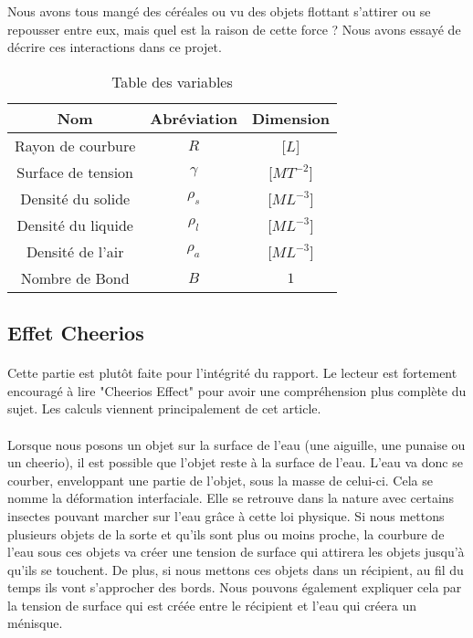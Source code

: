 Nous avons tous mangé des céréales ou vu des objets flottant s'attirer ou se repousser entre eux, mais quel est la raison de cette force ? Nous avons essayé de décrire ces interactions dans ce projet.

\begin{table}
    \centering
    \begin{tabular}{ccc}
        \hline
        Nom                & Abréviation & Dimension\\
        \hline
        Rayon de courbure  & $R$         & [$L$]\\
        Surface de tension & $\gamma$    & [$MT^{-2}$]\\ 
        Densité du solide  & $\rho_s$    & [$ML^{-3}$]\\
        Densité du liquide & $\rho_l$    & [$ML^{-3}$]\\
        Densité de l'air   & $\rho_a$    & [$ML^{-3}$]\\
        Nombre de Bond     & $B$         & $1$\\
        \hline
    \end{tabular}
    \caption{Table des variables}
\end{table}

\subsection{Effet Cheerios}
    \paragraph*{}{
        Cette partie est plutôt faite pour l'intégrité du rapport. Le lecteur est fortement encouragé à lire "Cheerios Effect"\cite{vella_cheerios_2005} pour avoir une compréhension plus complète du sujet. Les calculs viennent principalement de cet article.
    }
    \paragraph*{}{
        Lorsque nous posons un objet sur la surface de l'eau (une aiguille, une punaise ou un cheerio), il est possible que l'objet reste à la surface de l'eau. L'eau va donc se courber, enveloppant une partie de l'objet, sous la masse de celui-ci. Cela se nomme la déformation interfaciale. Elle se retrouve dans la nature avec certains insectes pouvant marcher sur l'eau grâce à cette loi physique. Si nous mettons plusieurs objets de la sorte et qu'ils sont plus ou moins proche, la courbure de l'eau sous ces objets va créer une tension de surface qui attirera les objets jusqu'à qu'ils se touchent. De plus, si nous mettons ces objets dans un récipient, au fil du temps ils vont s'approcher des bords. Nous pouvons également expliquer cela par la tension de surface qui est créée entre le récipient et l'eau qui créera un ménisque.
        }
        
